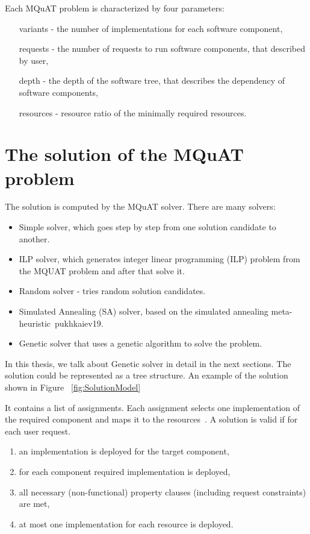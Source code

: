 Each MQuAT problem is characterized by four parameters:

\begin{itemize}
	\item[variants] - the number of implementations for each software component,
	\item[requests] - the number of requests to run software components, that described by user, 
	\item[depth] - the depth of the software tree, that describes the dependency of software components,
	\item[resources] - resource ratio of the minimally required resources.
\end{itemize}

\section{The solution of the MQuAT problem}

The solution is computed by the MQuAT solver. There are many solvers:

\begin{itemize}
	\item Simple solver, which goes step by step from one solution candidate to another.
	\item ILP solver, which generates integer linear programming (ILP) problem from the MQUAT problem and after that solve it.
	\item Random solver - tries random solution candidates.
	\item Simulated Annealing (SA) solver, based on the simulated annealing meta-heuristic~{pukhkaiev19}.
	\item Genetic solver that uses a genetic algorithm to solve the problem.
\end{itemize}

In this thesis, we talk about Genetic solver in detail in the next sections.
The solution could be represented as a tree structure. An example of the solution shown in Figure ~\ref{fig:SolutionModel}

It contains a list of assignments. Each assignment selects one implementation of the required component and maps it to the resources~\cite{gotz18}.
A solution is valid if for each user request.

\begin{enumerate}
	\item an implementation is deployed for the target component,
	\item for each component required implementation is deployed,
	\item all necessary (non-functional) property clauses (including request constraints) are met,
	\item at most one implementation for each resource is deployed.
\end{enumerate}


